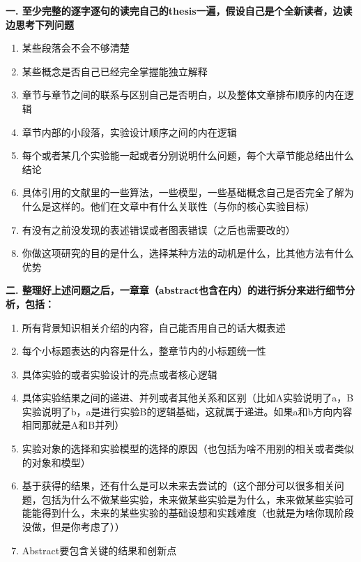 \textbf{一. 至少完整的逐字逐句的读完自己的thesis一遍，假设自己是个全新读者，边读边思考下列问题}
\begin{enumerate}
    \item 某些段落会不会不够清楚
    \item 某些概念是否自己已经完全掌握能独立解释
    \item 章节与章节之间的联系与区别自己是否明白，以及整体文章排布顺序的内在逻辑
    \item 章节内部的小段落，实验设计顺序之间的内在逻辑
    \item 每个或者某几个实验能一起或者分别说明什么问题，每个大章节能总结出什么结论
    \item 具体引用的文献里的一些算法，一些模型，一些基础概念自己是否完全了解为什么是这样的。他们在文章中有什么关联性（与你的核心实验目标）
    \item 有没有之前没发现的表述错误或者图表错误（之后也需要改的）
    \item 你做这项研究的目的是什么，选择某种方法的动机是什么，比其他方法有什么优势
\end{enumerate}

\textbf{二. 整理好上述问题之后，一章章（abstract也含在内）的进行拆分来进行细节分析，包括：}
\begin{enumerate}
    \item 所有背景知识相关介绍的内容，自己能否用自己的话大概表述
    \item 每个小标题表达的内容是什么，整章节内的小标题统一性
    \item 具体实验的或者实验设计的亮点或者核心逻辑
    \item 具体实验结果之间的递进、并列或者其他关系和区别（比如A实验说明了a，B实验说明了b，a是进行实验B的逻辑基础，这就属于递进。如果a和b方向内容相同那就是A和B并列）
    \item 实验对象的选择和实验模型的选择的原因（也包括为啥不用别的相关或者类似的对象和模型）
    \item 基于获得的结果，还有什么是可以未来去尝试的（这个部分可以很多相关问题，包括为什么不做某些实验，未来做某些实验是为什么，未来做某些实验可能能得到什么，未来的某些实验的基础设想和实践难度（也就是为啥你现阶段没做，但是你考虑了））
    \item Abstract要包含关键的结果和创新点
\end{enumerate}

